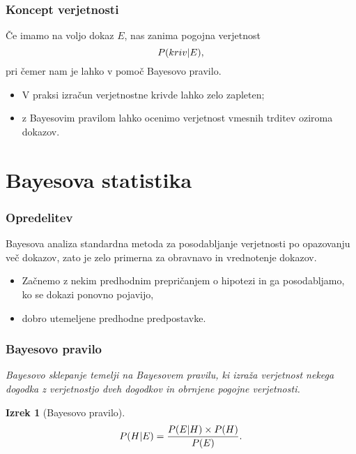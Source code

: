 \documentclass{beamer}
\newtheorem{izrek}{Izrek}
\begin{document}
\begin{frame}
   \frametitle{Koncept verjetnosti}
   Če imamo na voljo dokaz $E$, nas zanima pogojna verjetnost
   \[
       P(kriv \lvert E), \vspace{2mm}
   \]
   pri čemer nam je lahko v pomoč Bayesovo pravilo. \vspace{3mm}
   \begin{itemize}
      \item V praksi izračun verjetnostne krivde lahko zelo zapleten;
      \item z Bayesovim pravilom lahko ocenimo verjetnost vmesnih trditev oziroma dokazov.
   \end{itemize}
\end{frame}

\section{Bayesova statistika}

\begin{frame}
   \frametitle{Opredelitev}
   \begin{beamerboxesrounded}[]{Bayesova analiza}
      standardna metoda za posodabljanje verjetnosti po opazovanju več dokazov, zato je zelo primerna za obravnavo in vrednotenje 
      dokazov.
   \end{beamerboxesrounded} \vspace{3mm}
   \begin{itemize}
      \item Začnemo z nekim predhodnim prepričanjem o hipotezi in ga posodabljamo, ko se dokazi ponovno pojavijo,
      \item dobro utemeljene predhodne predpostavke.
   \end{itemize}

\end{frame}

\begin{frame}
   \frametitle{Bayesovo pravilo}
   \textit{
      Bayesovo sklepanje temelji na Bayesovem pravilu, ki izraža verjetnost nekega dogodka z verjetnostjo dveh dogodkov in obrnjene pogojne verjetnosti.
      \vspace{5mm}
   }
   \begin{izrek}[Bayesovo pravilo]
      \[
         P(H \lvert E) = \frac{P(E \lvert H) \times P(H)}{P(E)}. \vspace{2mm}
      \]
  \end{izrek}

\end{frame}
\end{document}
